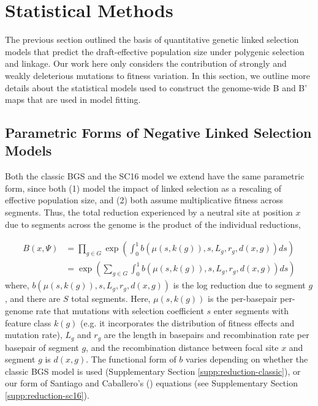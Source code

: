 \documentclass[11pt]{article}
\begin{document}
\section{Statistical Methods}

The previous section outlined the basis of quantitative genetic linked
selection models that predict the draft-effective population size under
polygenic selection and linkage. Our work here only considers the contribution
of strongly and weakly deleterious mutations to fitness variation. In this
section, we outline more details about the statistical models used to construct
the genome-wide B and B' maps that are used in model fitting.

\subsection{Parametric Forms of Negative Linked Selection Models}

Both the classic BGS and the SC16 model we extend have the same parametric
form, since both (1) model the impact of linked selection as a rescaling of
effective population size, and (2) both assume multiplicative fitness across
segments. Thus, the total reduction experienced by a neutral site at position
$x$ due to segments across the genome is the product of the individual
reductions,

\begin{align}
  \label{supp-eq:b}
  B(x, \Psi) &= \prod_{g \in G} \exp \left( \int_0^1 b(\mu(s, k(g)), s, L_g, r_g, d(x, g)) ds \right) \nonumber  \\
             &= \exp \left( \sum_{g \in G} \int_0^1 b(\mu(s, k(g)), s, L_g, r_g, d(x, g)) ds \right)
\end{align}
%
where, $b(\mu(s, k(g)), s, L_g, r_g, d(x,g))$ is the log reduction due to
segment $g$, and there are $S$ total segments. Here, $\mu(s, k(g))$ is the
per-basepair per-genome rate that mutations with selection coefficient $s$
enter segments with feature class $k(g)$ (e.g. it incorporates the distribution
of fitness effects and mutation rate), $L_g$ and $r_g$ are the length in
basepairs and recombination rate per basepair of segment $g$, and the
recombination distance between focal site $x$ and segment $g$ is $d(x, g)$. The
functional form of $b$ varies depending on whether the classic BGS model is
used (Supplementary Section \ref{supp:reduction-classic}), or our form of
Santiago and Caballero's (\citeyear{Santiago2016-mu}) equations (see
Supplementary Section \ref{supp:reduction-sc16}).
\end{document}
